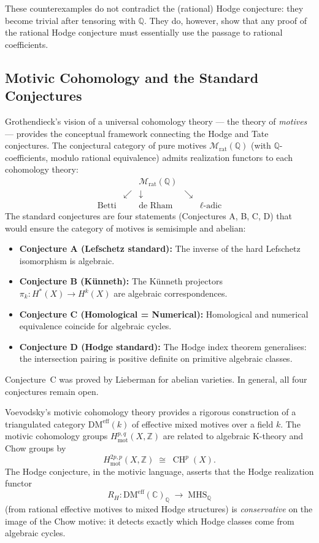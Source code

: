 \documentclass[11pt]{article}
\theoremstyle{definition}
\DeclareMathOperator{\CH}{CH}
\begin{document}
\noindent
These counterexamples do not contradict the (rational) Hodge conjecture:
they become trivial after tensoring with $\mathbb{Q}$.  They do, however,
show that any proof of the rational Hodge conjecture must essentially use
the passage to rational coefficients.

\subsection{Motivic Cohomology and the Standard Conjectures}
\label{sec:motivic}

Grothendieck's vision of a universal cohomology theory --- the theory of
\emph{motives} --- provides the conceptual framework connecting the Hodge
and Tate conjectures.  The conjectural category of pure motives
$\mathcal{M}_{\mathrm{rat}}(\mathbb{Q})$ (with $\mathbb{Q}$-coefficients,
modulo rational equivalence) admits realization functors to each
cohomology theory:
\[
  \begin{array}{ccccc}
    & & \mathcal{M}_{\mathrm{rat}}(\mathbb{Q}) & & \\
    & \swarrow & \downarrow & \searrow & \\
    \text{Betti} & & \text{de Rham} & & \ell\text{-adic}
  \end{array}
\]
The standard conjectures \cite{Grothendieck} are four statements
(Conjectures A, B, C, D) that would ensure the category of motives is
semisimple and abelian:
\begin{itemize}
  \item \textbf{Conjecture A (Lefschetz standard):} The inverse of the hard
    Lefschetz isomorphism is algebraic.
  \item \textbf{Conjecture B (K\"unneth):} The K\"unneth projectors
    $\pi_k : H^*(X) \to H^k(X)$ are algebraic correspondences.
  \item \textbf{Conjecture C (Homological = Numerical):} Homological and
    numerical equivalence coincide for algebraic cycles.
  \item \textbf{Conjecture D (Hodge standard):} The Hodge index theorem
    generalises: the intersection pairing is positive definite on primitive
    algebraic classes.
\end{itemize}
Conjecture~C was proved by Lieberman for abelian varieties.  In general,
all four conjectures remain open.

Voevodsky's motivic cohomology theory \cite{Voevodsky} provides a
rigorous construction of a triangulated category $\mathrm{DM}^{\mathrm{eff}}(k)$
of effective mixed motives over a field $k$.  The motivic cohomology groups
$H^{p,q}_{\mathrm{mot}}(X, \mathbb{Z})$ are related to algebraic K-theory
and Chow groups by
\[
  H^{2p,p}_{\mathrm{mot}}(X, \mathbb{Z}) \;\cong\; \CH^p(X).
\]
The Hodge conjecture, in the motivic language, asserts that the Hodge
realization functor
\[
  R_H : \mathrm{DM}^{\mathrm{eff}}(\mathbb{C})_{\mathbb{Q}}
  \;\longrightarrow\;
  \mathrm{MHS}_{\mathbb{Q}}
\]
(from rational effective motives to mixed Hodge structures) is
\emph{conservative} on the image of the Chow motive: it detects exactly
which Hodge classes come from algebraic cycles.
\end{document}
